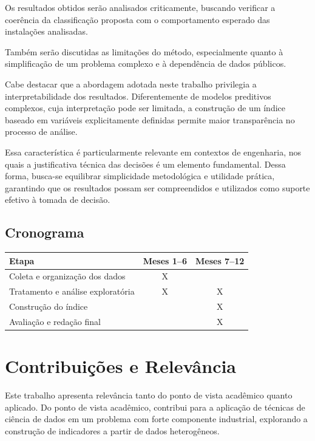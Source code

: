 \documentclass[a4paper,12pt]{article}
\begin{document}
Os resultados obtidos serão analisados criticamente, buscando verificar a coerência da classificação proposta com o comportamento esperado das instalações analisadas.

Também serão discutidas as limitações do método, especialmente quanto à simplificação de um problema complexo e à dependência de dados públicos.

Cabe destacar que a abordagem adotada neste trabalho privilegia a interpretabilidade dos resultados. Diferentemente de modelos preditivos complexos, cuja interpretação pode ser limitada, a construção de um índice baseado em variáveis explicitamente definidas permite maior transparência no processo de análise.

Essa característica é particularmente relevante em contextos de engenharia, nos quais a justificativa técnica das decisões é um elemento fundamental. Dessa forma, busca-se equilibrar simplicidade metodológica e utilidade prática, garantindo que os resultados possam ser compreendidos e utilizados como suporte efetivo à tomada de decisão.

\subsection*{Cronograma}

\begin{table}[H]
\centering
\renewcommand{\arraystretch}{1.2}
\begin{tabularx}{\textwidth}{|X|c|c|}
\hline
\textbf{Etapa} & \textbf{Meses 1--6} & \textbf{Meses 7--12} \\
\hline
Coleta e organização dos dados & X &  \\
\hline
Tratamento e análise exploratória & X & X \\
\hline
Construção do índice &  & X \\
\hline
Avaliação e redação final &  & X \\
\hline
\end{tabularx}
\end{table} 

\section{Contribuições e Relevância}

Este trabalho apresenta relevância tanto do ponto de vista acadêmico quanto aplicado. Do ponto de vista acadêmico, contribui para a aplicação de técnicas de ciência de dados em um problema com forte componente industrial, explorando a construção de indicadores a partir de dados heterogêneos.
\end{document}
